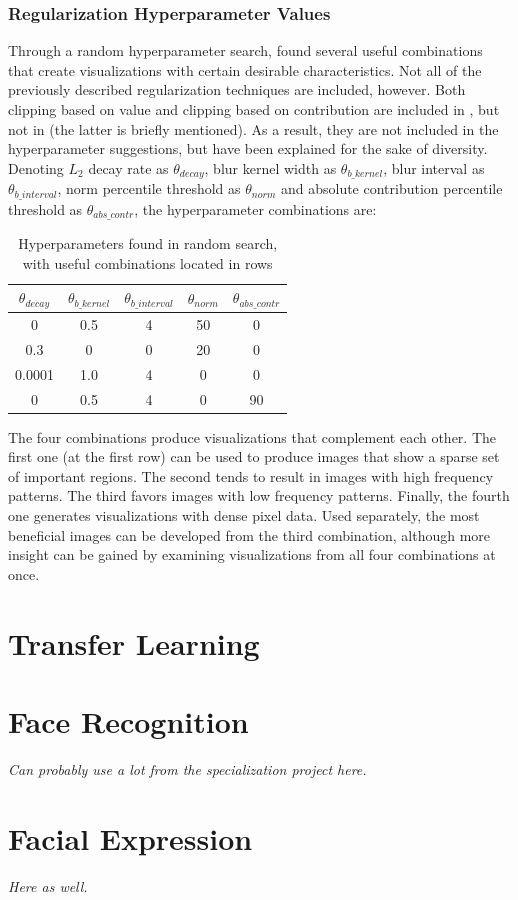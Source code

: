 \subsubsection{Regularization Hyperparameter Values}

Through a random hyperparameter search, \cite{deepvis} found several useful combinations that create visualizations with certain desirable characteristics. Not all of the previously described regularization techniques are included, however. Both clipping based on value and clipping based on contribution are included in \cite{deepvis_web}, but not in \cite{deepvis} (the latter is briefly mentioned). As a result, they are not included in the hyperparameter suggestions, but have been explained for the sake of diversity. \\

\noindent Denoting $L_2$ decay rate as $\theta_{decay}$, blur kernel width as $\theta_{b\_kernel}$, blur interval as $\theta_{b\_interval}$, norm percentile threshold as $\theta_{norm}$ and absolute contribution percentile threshold as $\theta_{abs\_contr}$, the hyperparameter combinations are:

\begin{table}[!h]
\begin{center}
\begin{tabular}{|c|c|c|c|c|}
\hline
\textbf{$\theta_{decay}$} & \textbf{$\theta_{b\_kernel}$} & \textbf{$\theta_{b\_interval}$} & \textbf{$\theta_{norm}$} & \textbf{$\theta_{abs\_contr}$} \\ \hline
0 & 0.5 & 4 & 50 & 0 \\ \hline
0.3 & 0 & 0 & 20 & 0 \\ \hline
0.0001 & 1.0 & 4 & 0 & 0 \\ \hline
0 & 0.5 & 4 & 0 & 90 \\ \hline
\end{tabular}
\end{center}
\caption{Hyperparameters found in random search, with useful combinations located in rows}
\label{tab:reg_hyperparams}
\end{table}

\noindent The four combinations produce visualizations that complement each other. The first one (at the first row) can be used to produce images that show a sparse set of important regions. The second tends to result in images with high frequency patterns. The third favors images with low frequency patterns. Finally, the fourth one generates visualizations with dense pixel data. Used separately, the most beneficial images can be developed from the third combination, although more insight can be gained by examining visualizations from all four combinations at once.


\section{Transfer Learning}

\section{Face Recognition}

\textit{Can probably use a lot from the specialization project here.}

\section{Facial Expression}

\textit{Here as well.}

\cleardoublepage